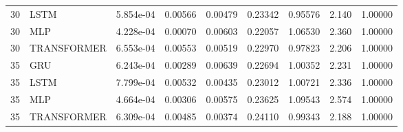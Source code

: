\begin{table}[t]
{\begin{tabular}{lllllllll}
30 & LSTM & 5.854e-04 & 0.00566 & 0.00479 & 0.23342 & 0.95576 & 2.140 & 1.00000 \\
30 & MLP & 4.228e-04 & 0.00070 & 0.00603 & 0.22057 & 1.06530 & 2.360 & 1.00000 \\
30 & TRANSFORMER & 6.553e-04 & 0.00553 & 0.00519 & 0.22970 & 0.97823 & 2.206 & 1.00000 \\
35 & GRU & 6.243e-04 & 0.00289 & 0.00639 & 0.22694 & 1.00352 & 2.231 & 1.00000 \\
35 & LSTM & 7.799e-04 & 0.00532 & 0.00435 & 0.23012 & 1.00721 & 2.336 & 1.00000 \\
35 & MLP & 4.664e-04 & 0.00306 & 0.00575 & 0.23625 & 1.09543 & 2.574 & 1.00000 \\
35 & TRANSFORMER & 6.309e-04 & 0.00485 & 0.00374 & 0.24110 & 0.99343 & 2.188 & 1.00000 \\
\hline
\end{tabular}%
}
\end{table}